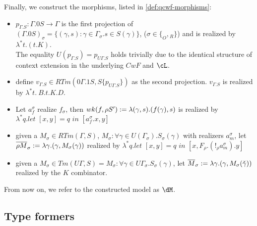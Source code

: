 \documentclass[12pt,a4paper]{article}
\renewcommand{\O}{_{O}}\alwaysmath{O}
\newcommand{\R}{\ensuremath{_{R}}}
\begin{document}
Finally, we construct the morphisms, listed in \cref{def:qcwf-morphisms}:
\begin{itemize}
  \item $p_{\Gamma.S}: \Gamma. 0 S \to \Gamma$ is the first projection of $(\Gamma. 0 S)_\sigma = \{ (\gamma, s) : \gamma \in \Gamma_\sigma. s \in S(\gamma)\}$, ($\sigma \in \{\O, \R \}$) and is realized by $\lambda^* t. (t.K)$.\\
  The equality $U(p_{\Gamma.S}) = p_{U\Gamma.S}$ holds trivially due to the identical structure of context extension in the underlying $CwF$ and $\cL$.
  
  \item define $v_{\Gamma.S} \in RTm(0\Gamma.1S, S\{p_{U\Gamma.S}\})$ as the second projection. $v_{\Gamma.S}$ is realized by $\lambda^* t.\ B.t.K.D$.
  
  \item Let $a^\sigma_f$ realize $f_\sigma$, then $wk(f, \rho S') := \lambda (\gamma, s). (f (\gamma), s)$ is realized by $\lambda^* q. \textit{let }[x, y] = q \textit{ in } [a^\sigma_f . x , y]$
  
  \item given a $M_\sigma \in RTm(\Gamma, S)$, $M_\sigma : \forall \gamma \in U(\Gamma_\sigma). S_\sigma(\gamma)$ with realizers $a^\sigma_m$, let $\overline{\rho M}_\sigma := \lambda \gamma. (\gamma, M_\sigma(\gamma))$ realized by $\lambda^* q. \textit{let }[x, y] = q \textit{ in } [x, F_\rho.(!_\rho a^\sigma_m).y]$   
  
  \item given a $M_\sigma \in Tm(U\Gamma, S) = M_\sigma : \forall \gamma \in U\Gamma_\sigma. S_\sigma(\gamma)$, let $\overline{M}_\sigma := \lambda \gamma. (\gamma, M_\sigma(\check\gamma))$ realized by the $K$ combinator.
\end{itemize}

From now on, we refer to the constructed model as $\dM$.

\subsection{Type formers}
\end{document}
